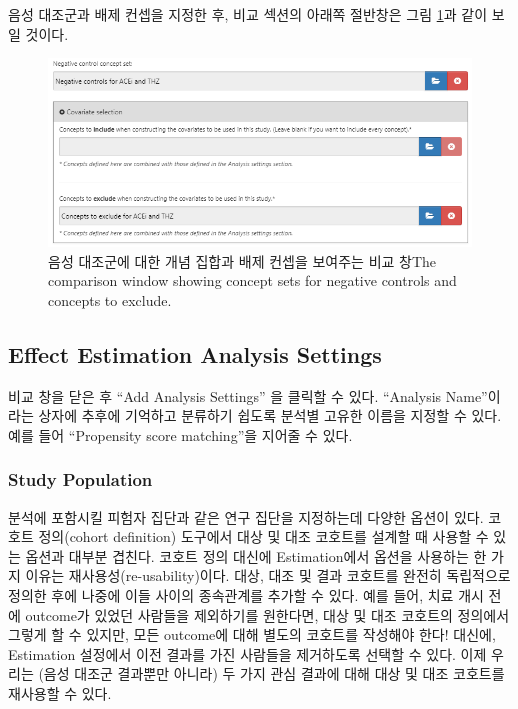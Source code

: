 \documentclass[11pt]{book}
\theoremstyle{definition}
\theoremstyle{definition}
\theoremstyle{definition}
\theoremstyle{remark}
\begin{document}
음성 대조군과 배제 컨셉을 지정한 후, 비교 섹션의 아래쪽 절반창은 그림
\ref{fig:comparisons2}과 같이 보일 것이다.

\begin{figure}

{\centering \includegraphics[width=1\linewidth]{images/PopulationLevelEstimation/comparisons2} 

}

\caption{음성 대조군에 대한 개념 집합과 배제 컨셉을 보여주는 비교 창The comparison window showing concept sets for negative controls and concepts to exclude.}\label{fig:comparisons2}
\end{figure}

\subsection{Effect Estimation Analysis
Settings}\label{effect-estimation-analysis-settings}

비교 창을 닫은 후 ``Add Analysis Settings'' 을 클릭할 수 있다.
``Analysis Name''이라는 상자에 추후에 기억하고 분류하기 쉽도록 분석별
고유한 이름을 지정할 수 있다. 예를 들어 ``Propensity score matching''을
지어줄 수 있다.

\subsubsection*{Study Population}\label{study-population}

분석에 포함시킬 피험자 집단과 같은 연구 집단을 지정하는데 다양한 옵션이
있다. 코호트 정의(cohort definition) 도구에서 대상 및 대조 코호트를
설계할 때 사용할 수 있는 옵션과 대부분 겹친다. 코호트 정의 대신에
Estimation에서 옵션을 사용하는 한 가지 이유는
재사용성(re-usability)이다. 대상, 대조 및 결과 코호트를 완전히
독립적으로 정의한 후에 나중에 이들 사이의 종속관계를 추가할 수 있다.
예를 들어, 치료 개시 전에 outcome가 있었던 사람들을 제외하기를 원한다면,
대상 및 대조 코호트의 정의에서 그렇게 할 수 있지만, 모든 outcome에 대해
별도의 코호트를 작성해야 한다! 대신에, Estimation 설정에서 이전 결과를
가진 사람들을 제거하도록 선택할 수 있다. 이제 우리는 (음성 대조군
결과뿐만 아니라) 두 가지 관심 결과에 대해 대상 및 대조 코호트를 재사용할
수 있다.
\end{document}
